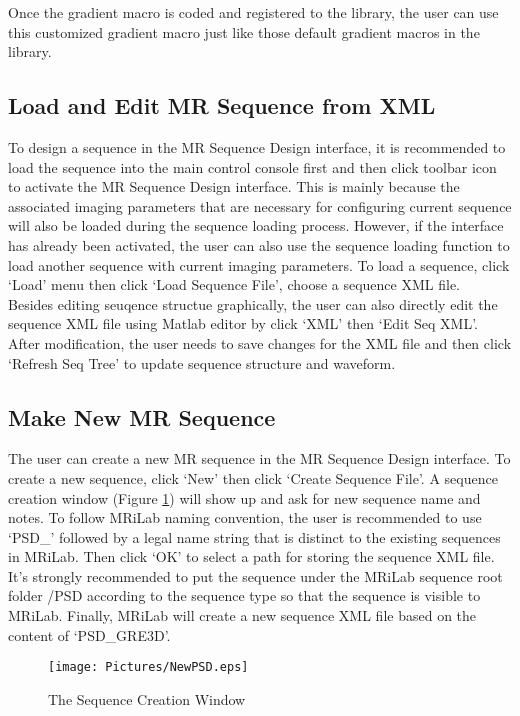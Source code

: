 \documentclass{book}%
\begin{document}
Once the gradient macro is coded and registered to the library, the user can use this customized gradient macro just like those default gradient macros in the library.

\subsection{Load and Edit MR Sequence from XML}
To design a sequence in the MR Sequence Design interface, it is recommended to load the sequence into the main control console first and then click toolbar icon to activate the MR Sequence Design interface. This is mainly because the associated imaging parameters that are necessary for configuring current sequence will also be loaded during the sequence loading process. However, if the interface has already been activated, the user can also use the sequence loading function to load another sequence with current imaging parameters. To load a sequence, click `Load' menu then click `Load Sequence File', choose a sequence XML file.\\

Besides editing seuqence structue graphically, the user can also directly edit the sequence XML file using Matlab editor by click `XML' then `Edit Seq XML'. After modification, the user needs to save changes for the XML file and then click `Refresh Seq Tree' to update sequence structure and waveform.

\subsection{Make New MR Sequence}
The user can create a new MR sequence in the MR Sequence Design interface. To create a new sequence, click `New' then click `Create Sequence File'. A sequence creation window (Figure \ref{fig:NewPSD}) will show up and ask for new sequence name and notes. To follow MRiLab naming convention, the user is recommended to use `PSD\_' followed by a legal name string that is distinct to the existing sequences in MRiLab. Then click `OK' to select a path for storing the sequence XML file. It's strongly recommended to put the sequence under the MRiLab sequence root folder /PSD according to the sequence type so that the sequence is visible to MRiLab. Finally, MRiLab will create a new sequence XML file based on the content of `PSD\_GRE3D'.

\begin{figure}[htbp]
	\centering
		\texttt{[image: Pictures/NewPSD.eps]}
	\caption{The Sequence Creation Window}
	\label{fig:NewPSD}
\end{figure}
\end{document}
